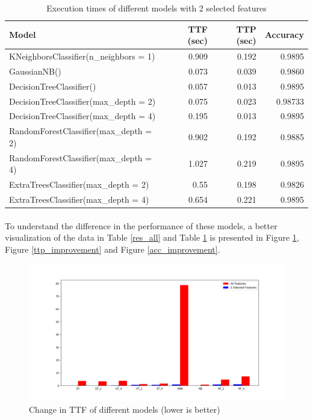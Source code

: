 \begin{table}[h]
    \caption{Execution times of different models with 2 selected features}
    \centering
    \label{res_2}
    \begin{tabular}{| l | r | r | r |}
        \hline
        \textbf{Model} & \textbf{TTF (sec)} & \textbf{TTP (sec)} & \textbf{Accuracy} \\
        \hline
        KNeighborsClassifier(n\_neighbors = 1) & 0.909 & 0.192 & 0.9895 \\
        \hline
        GaussianNB() & 0.073 & 0.039 & 0.9860 \\
        \hline
        DecisionTreeClassifier() & 0.057 & 0.013 & 0.9895 \\
        \hline
        DecisionTreeClassifier(max\_depth = 2) & 0.075 & 0.023 & 0.98733 \\
        \hline
        DecisionTreeClassifier(max\_depth = 4) & 0.195 & 0.013 & 0.9895 \\
        \hline
        RandomForestClassifier(max\_depth = 2) & 0.902 & 0.192 & 0.9885 \\
        \hline
        RandomForestClassifier(max\_depth = 4) & 1.027 & 0.219 & 0.9895 \\
        \hline
        ExtraTreesClassifier(max\_depth = 2) & 0.55 & 0.198 & 0.9826 \\
        \hline
        ExtraTreesClassifier(max\_depth = 4) & 0.654 & 0.221 & 0.9895 \\
        \hline
    \end{tabular}
\end{table}

\paragraph{}
To understand the difference in the performance of these models, a better visualization of the data in Table \ref{res_all} and Table \ref{res_2} is presented in Figure \ref{ttf_improvement}, Figure \ref{ttp_improvement} and Figure \ref{acc_improvement}.

\begin{figure}[h]
    \hfill\includegraphics[width=1\textwidth]{Chapter4/ttf_improvement}\hspace*{\fill}
    \caption{Change in TTF of different models (lower is better)}
    \label{ttf_improvement}
\end{figure}

